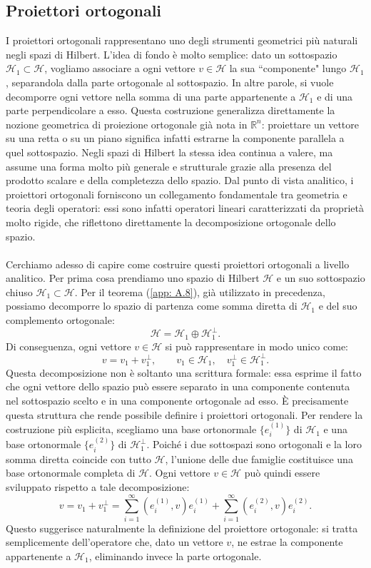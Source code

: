 \documentclass[a4paper,12pt]{report}
\begin{document}
\subsection{Proiettori ortogonali}

I proiettori ortogonali rappresentano uno degli strumenti geometrici più naturali negli spazi di Hilbert. L’idea di fondo è molto semplice: dato un sottospazio $\mathscr{H}_1\subset \mathscr{H}$, vogliamo associare a ogni vettore $v\in \mathscr{H}$ la sua “componente" lungo $\mathscr{H}_1$, separandola dalla parte ortogonale al sottospazio. In altre parole, si vuole decomporre ogni vettore nella somma di una parte appartenente a $\mathscr{H}_1$ e di una parte perpendicolare a esso.
Questa costruzione generalizza direttamente la nozione geometrica di proiezione ortogonale già nota in $\mathbb{R}^n$: proiettare un vettore su una retta o su un piano significa infatti estrarne la componente parallela a quel sottospazio. Negli spazi di Hilbert la stessa idea continua a valere, ma assume una forma molto più generale e strutturale grazie alla presenza del prodotto scalare e della completezza dello spazio.
Dal punto di vista analitico, i proiettori ortogonali forniscono un collegamento fondamentale tra geometria e teoria degli operatori: essi sono infatti operatori lineari caratterizzati da proprietà molto rigide, che riflettono direttamente la decomposizione ortogonale dello spazio.
\\
\\ Cerchiamo adesso di capire come costruire questi proiettori ortogonali a livello analitico. Per prima cosa prendiamo uno spazio di Hilbert \(\mathscr{H}\) e un suo sottospazio chiuso \(\mathscr{H}_1\subset\mathscr{H}\). Per il teorema (\ref{app: A.8}), già utilizzato in precedenza, possiamo decomporre lo spazio di partenza come somma diretta di \(\mathscr{H}_1\) e del suo complemento ortogonale:
\[
\mathscr{H}=\mathscr{H}_1\oplus \mathscr{H}_1^\perp.
\]
Di conseguenza, ogni vettore \(v\in\mathscr{H}\) si può rappresentare in modo unico come:
\[
v=v_1+v_1^\perp,
\qquad
v_1\in\mathscr{H}_1,\quad v_1^\perp\in\mathscr{H}_1^\perp.
\]
Questa decomposizione non è soltanto una scrittura formale: essa esprime il fatto che ogni vettore dello spazio può essere separato in una componente contenuta nel sottospazio scelto e in una componente ortogonale ad esso. È precisamente questa struttura che rende possibile definire i proiettori ortogonali. Per rendere la costruzione più esplicita, scegliamo una base ortonormale \(\{e_i^{(1)}\}\) di \(\mathscr{H}_1\) e una base ortonormale \(\{e_i^{(2)}\}\) di \(\mathscr{H}_1^\perp\). Poiché i due sottospazi sono ortogonali e la loro somma diretta coincide con tutto \(\mathscr{H}\), l’unione delle due famiglie costituisce una base ortonormale completa di \(\mathscr{H}\).
Ogni vettore \(v\in\mathscr{H}\) può quindi essere sviluppato rispetto a tale decomposizione:
\[
v
=v_1+v_1^\perp=
\sum_{i=1}^\infty (e_i^{(1)},v)e_i^{(1)}
+
\sum_{i=1}^\infty (e_i^{(2)},v)e_i^{(2)}.
\]
Questo suggerisce naturalmente la definizione del proiettore ortogonale: si tratta semplicemente dell’operatore che, dato un vettore \(v\), ne estrae la componente appartenente a \(\mathscr{H}_1\), eliminando invece la parte ortogonale.
\end{document}
